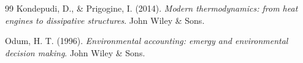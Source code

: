 \vspace{1cm}
\begin{thebibliography}{99}
Kondepudi, D., \& Prigogine, I. (2014). \textit{Modern thermodynamics: from heat engines to dissipative structures}. John Wiley \& Sons.

Odum, H. T. (1996). \textit{Environmental accounting: emergy and environmental decision making}. John Wiley \& Sons.
\end{thebibliography}
